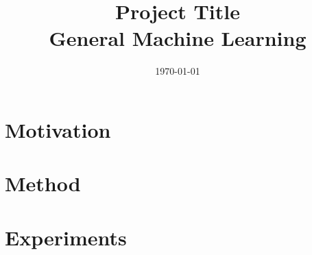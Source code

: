 \documentclass{article}
\title{%
  Project Title \\
  \large General Machine Learning}
\author{}
\date{\today}
\begin{document}
\maketitle

\section{Motivation}

\section{Method}

\section{Experiments}
\end{document}
